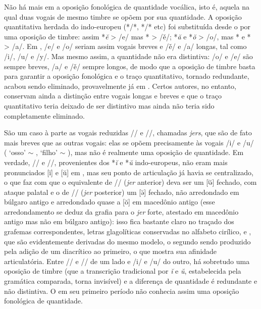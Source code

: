 Não há mais em  a oposição fonológica de quantidade vocálica, isto
é, aquela na qual duas vogais de mesmo timbre se opõem por sua quantidade.
A oposição quantitativa herdada do indo-europeu
(*\slash{}*, *\slash{}* etc)
foi substituída desde o  por uma oposição de timbre: assim *\emph{ĕ}
> /e/ mas * > /ě/; *\emph{ă} e *\emph{ŏ} > /o/, mas * e
* > /a/.
Em , /e/ e /o/ seriam assim vogais breves e /ě/ e /a/ longas, tal
como /i/, /u/ e /y/.
Mas mesmo assim, a quantidade não era distintiva: /o/ e /e/ são sempre breves,
/a/ e /ě/ sempre longos, de modo que a oposição de timbre basta para garantir a
oposição fonológica e o traço quantitativo, tornado redundante, acabou sendo
eliminado, provavelmente já em .
Certos autores, no entanto, conservam ainda a distinção entre vogais longas e
breves e que o traço quantitativo teria deixado de ser distintivo mas ainda não
teria sido completamente eliminado.

São um caso à parte as vogais reduzidas /\jeri{}/ e /\jeru{}/,
chamadas \emph{jers}, que são de fato mais breves que as outras vogais:
elas se opõem precisamente às vogais /i/ e /u/ (
 `osso' $\sim$ 
, 
 `filho' $\sim$ 
), mas não é realmente uma oposição de
quantidade.
Em verdade, /\jeri{}/ e /\jeru{}/, provenientes dos *\emph{ĭ} e
*\emph{ŭ} indo-europeus, não eram mais pronunciados [ĭ] e [ŭ] em ,
mas seu ponto de articulação já havia se centralizado, o que faz com que o
equivalente de /\jeri{}/ (\emph{jer} anterior) deva ser um [ʲə̆] fechado,
com ataque palatal e o de /\jeru{}/ (\emph{jer} posterior) um [ə̆] fechado,
não arredondado em búlgaro antigo e arredondado quase a [ŏ] em macedônio antigo
(esse arredondamento se deduz da grafia  para o \emph{jer}
forte, atestado em macedônio antigo mas não em búlgaro antigo): isso fica
bastante claro no traçado dos grafemas correspondentes, letras glagolíticas
conservadas no alfabeto cirílico,  e ,
que são evidentemente derivadas do mesmo modelo, o segundo sendo produzido pela
adição de um diacrítico ao primeiro, o que mostra sua afinidade articulatória.
Entre /\jeri{}/ e /\jeru{}/ de um lado e /i/ e /u/ do outro, há
sobretudo uma oposição de timbre (que a transcrição tradicional por \emph{ĭ} e
\emph{ŭ}, estabelecida pela gramática comparada, torna invisível) e a diferença
de quantidade é redundante e não distintiva.
O  em seu primeiro período não conhecia assim uma oposição
fonológica de quantidade.

